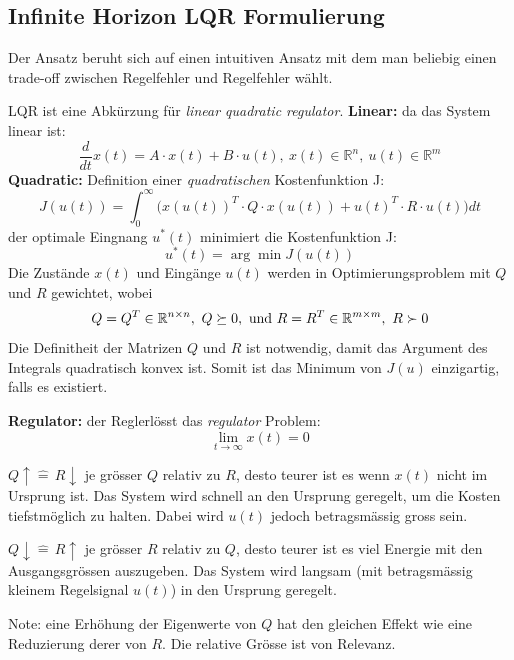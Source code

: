 \subsection{Infinite Horizon LQR Formulierung}
    Der Ansatz beruht sich auf einen intuitiven Ansatz mit dem man beliebig einen trade-off zwischen Regelfehler und Regelfehler wählt. 
    
    LQR ist eine Abkürzung für \textit{linear quadratic regulator}. 
    \textbf{Linear:} da das System linear ist:
    \[\frac{d}{dt}x(t) = A\cdot x(t) + B\cdot u(t),\ x(t) \in \mathbb{R}^n,\ u(t) \in \mathbb{R}^m\]
    \textbf{Quadratic:} Definition einer  \textit{quadratischen} Kostenfunktion J:
    \[J(u(t)) = \int_0^\infty\Big(x(u(t))^T\cdot Q\cdot x(u(t)) + u(t)^T \cdot R \cdot u(t)\Big)dt\]
    der optimale Eingnang $u^*(t)$ minimiert die Kostenfunktion J:
     \[u^*(t) = \arg\min J(u(t))\]
     Die Zustände $x(t)$ und Eingänge $u(t)$ werden in Optimierungsproblem mit $Q$ und $R$ gewichtet, wobei 
     \[Q=Q^T \in \mathbb{R}^{n\times n},\ Q \succeq 0,\ \textnormal{und}\ R = R^T \in \mathbb{R}^{m\times m},\ R\succ 0\]
     Die Definitheit der Matrizen $Q$ und $R$ ist notwendig, damit das Argument des Integrals quadratisch konvex ist.
     Somit ist das Minimum von $J(u)$ einzigartig, falls es existiert.
    
    \textbf{Regulator:}
    der Reglerlösst das \textit{regulator} Problem:
    \[\lim\limits_{t \to \infty}x(t)=0\]
    
    
    
    $\boxed{Q\uparrow \widehat{=}\, R \downarrow}$ je grösser $Q$ relativ zu $R$, desto teurer ist es wenn $x(t)$ nicht im Ursprung ist. Das System wird schnell an den Ursprung geregelt, um die Kosten tiefstmöglich zu halten. Dabei wird $u(t)$ jedoch betragsmässig gross sein.
    
    $\boxed{Q\downarrow \widehat{=}\, R \uparrow}$ je grösser $R$ relativ zu $Q$, desto teurer ist es viel Energie mit den Ausgangsgrössen auszugeben. Das System wird langsam (mit betragsmässig kleinem Regelsignal $u(t)$) in den Ursprung geregelt.
    
    Note: eine Erhöhung der Eigenwerte von $Q$ hat den gleichen Effekt wie eine Reduzierung derer von $R$. Die relative Grösse ist von Relevanz.
    
